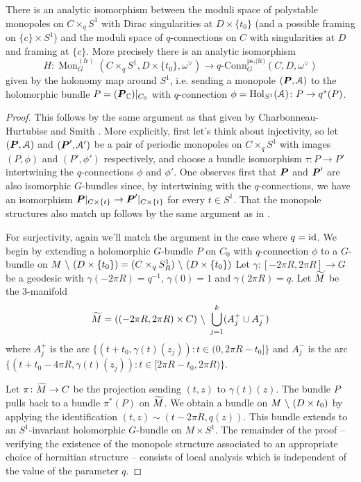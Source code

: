 \documentclass[10pt, oneside]{article}
\DeclareMathOperator{\mon}{Mon}
\newcommand{\qconn}{q\text{-Conn}}
\newcommand{\fr}{\mathrm{fr}}
\DeclareMathOperator{\Hol}{Hol}
\begin{document}
\begin{theorem} \label{monopole_qconn_comparison_thm}
There is an analytic isomorphism between the moduli space of polystable monopoles on $C \times_q S^1$ with Dirac singularities at $D \times \{t_0\}$ (and a possible framing on $\{c\} \times S^1$) and the moduli space of $q$-connections on $C$ with singularities at $D$ and framing at $\{c\}$.  More precisely there is an analytic isomorphism
\[H \colon \mon^{(\fr)}_G(C \times_q S^1, D \times \{t_0\}, \omega^\vee) \to \qconn_G^{\text{ps,(fr)}}(C, D, \omega^\vee)\]
given by the holonomy map around $S^1$, i.e. sending a monopole $(\boldsymbol{P}, \mathcal{A})$ to the holomorphic bundle $P = (\boldsymbol{P}_{\mathbb{C}})|_{C_0}$ with $q$-connection $\phi = \Hol_{S^1}(\mc A) \colon P \to q^*(P)$.  
\end{theorem}

\begin{proof}
This follows by the same argument as that given by Charbonneau-Hurtubise \cite{CharbonneauHurtubise} and Smith \cite{Smith}.  More explicitly, first let's think about injectivity, so let $(\boldsymbol{P}, \mathcal{A})$ and $(\boldsymbol{P}', \mathcal{A}')$ be a pair of periodic monopoles on $C \times_q S^1$ with images $(P,\phi)$ and $(P', \phi')$ respectively, and choose a bundle isomorphism $\tau \colon P \to P'$ intertwining the $q$-connections $\phi$ and $\phi'$.  One observes first that $\boldsymbol{P}$ and $\boldsymbol{P}'$ are also isomorphic $G$-bundles since, by intertwining with the $q$-connections, we have an isomorphism $\boldsymbol{P}|_{C \times \{t\}} \to \boldsymbol{P}'|_{C \times \{t\}}$ for every $t \in S^1$.  That the monopole structures also match up follows by the same argument as in \cite[Proposition 4.7]{CharbonneauHurtubise}.

For surjectivity, again we'll match the argument in the case where $q=\operatorname{id}$.  We begin by extending a holomorphic $G$-bundle $P$ on $C_0$ with $q$-connection $\phi$ to a $G$-bundle on $M \ \backslash \  (D \times \{t_0\}) = (C \times_q S^1_R) \ \backslash \  (D \times \{t_0\})$  Let $\gamma \colon [-2\pi R,2\pi R] \to G$ be a geodesic with $\gamma(-2\pi R) = q^{-1}$, $\gamma(0)=1$ and $\gamma(2\pi R) = q$.  Let $\widetilde{M}$ be the 3-manifold
\[\widetilde{M} = ((-2\pi R, 2\pi R) \times C) \ \backslash \  \bigcup_{j=1}^k (A^+_j \cup A^-_j)\]
where $A^+_j$ is the arc $\{(t+ t_0,\gamma(t)(z_j)) \colon t \in (0, 2\pi R - t_0]\}$ and $A^-_j$ is the arc $\{(t + t_0 - 4 \pi R,\gamma(t)(z_j)) \colon t \in [2\pi R-t_0, 2 \pi R)\}$.

Let $\pi \colon \widetilde{M} \to C$ be the projection sending $(t,z)$ to $\gamma(t)(z)$.  The bundle $P$ pulls back to a bundle $\pi^*(P)$ on $\widetilde{M}$.  We obtain a bundle on $M \ \backslash \  (D \times t_0)$ by applying the identification $(t,z) \sim (t - 2 \pi R, q(z))$.  This bundle extends to an $S^1$-invariant holomorphic $G$-bundle on $M \times S^1$.  The remainder of the proof -- verifying the existence of the monopole structure associated to an appropriate choice of hermitian structure -- consists of local analysis which is independent of the value of the parameter $q$. 


\end{proof}
\end{document}

